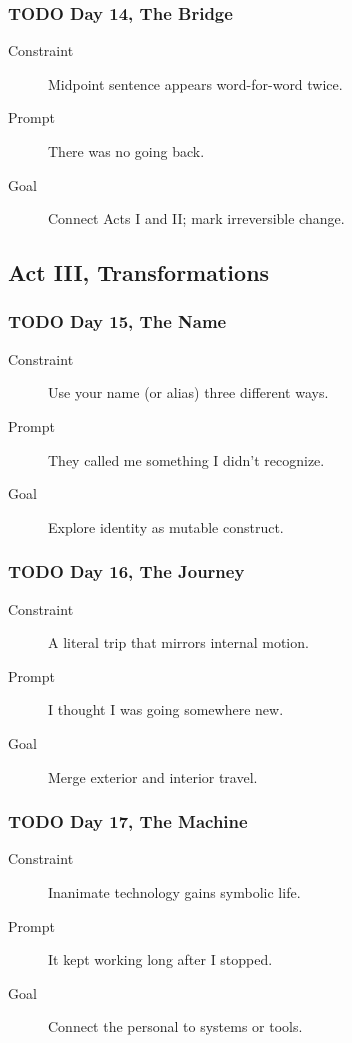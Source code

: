 \documentclass[11pt]{article}
\begin{document}
\subsubsection*{{\bfseries\sffamily TODO} Day 14, The Bridge}
\label{sec:org036f876}
\begin{description}
\item[{Constraint}] Midpoint sentence appears word-for-word twice.
\item[{Prompt}] There was no going back.
\item[{Goal}] Connect Acts I and II; mark irreversible change.
\end{description}
\subsection*{Act III, Transformations}
\label{sec:org2952c4e}
\subsubsection*{{\bfseries\sffamily TODO} Day 15, The Name}
\label{sec:orgd43fdd4}
\begin{description}
\item[{Constraint}] Use your name (or alias) three different ways.
\item[{Prompt}] They called me something I didn’t recognize.
\item[{Goal}] Explore identity as mutable construct.
\end{description}
\subsubsection*{{\bfseries\sffamily TODO} Day 16, The Journey}
\label{sec:org5e70a1f}
\begin{description}
\item[{Constraint}] A literal trip that mirrors internal motion.
\item[{Prompt}] I thought I was going somewhere new.
\item[{Goal}] Merge exterior and interior travel.
\end{description}
\subsubsection*{{\bfseries\sffamily TODO} Day 17, The Machine}
\label{sec:org864adb3}
\begin{description}
\item[{Constraint}] Inanimate technology gains symbolic life.
\item[{Prompt}] It kept working long after I stopped.
\item[{Goal}] Connect the personal to systems or tools.
\end{description}
\end{document}
